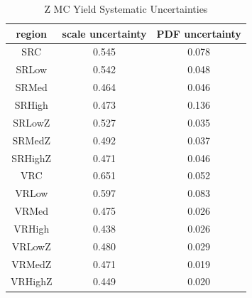 \begin{table}[htbp]
\caption{Z MC Yield Systematic Uncertainties}
\begin{center}
\begin{tabular}{c|c|c}
region & scale uncertainty & PDF uncertainty \\
\hline
SRC & 0.545 & 0.078 \\
SRLow & 0.542 & 0.048 \\
SRMed & 0.464 & 0.046 \\
SRHigh & 0.473 & 0.136 \\
SRLowZ & 0.527 & 0.035 \\
SRMedZ & 0.492 & 0.037 \\
SRHighZ & 0.471 & 0.046 \\
VRC & 0.651 & 0.052 \\
VRLow & 0.597 & 0.083 \\
VRMed & 0.475 & 0.026 \\
VRHigh & 0.438 & 0.026 \\
VRLowZ & 0.480 & 0.029 \\
VRMedZ & 0.471 & 0.019 \\
VRHighZ & 0.449 & 0.020 \\
\end{tabular}
\end{center}
\label{tab:ZMC_yield_systematics} 
\end{table}

